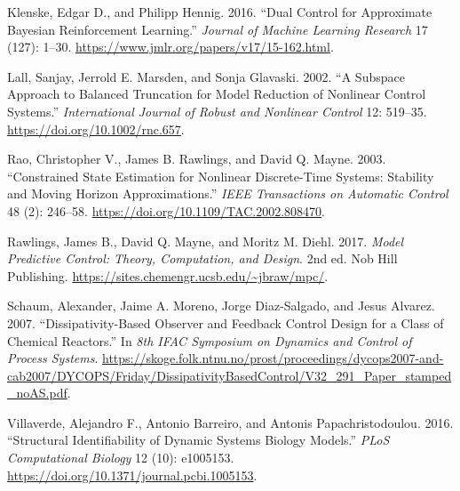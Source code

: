 \documentclass[
  11pt,
]{article}
\newlength{\cslhangindent}
\newlength{\cslentryspacingunit} %
\newenvironment{CSLReferences}[2] %
 {%
  \setlength{\parindent}{0pt}
  \ifodd #1
  \let\oldpar\par
  \def\par{\hangindent=\cslhangindent\oldpar}
  \fi
  \setlength{\parskip}{#2\cslentryspacingunit}
 }%
 {}
\begin{document}
\begin{CSLReferences}{1}{0}
\leavevmode{}%
Klenske, Edgar D., and Philipp Hennig. 2016. {``Dual Control for
Approximate Bayesian Reinforcement Learning.''} \emph{Journal of Machine
Learning Research} 17 (127): 1--30.
\url{https://www.jmlr.org/papers/v17/15-162.html}.

\leavevmode{}%
Lall, Sanjay, Jerrold E. Marsden, and Sonja Glavaski. 2002. {``A
Subspace Approach to Balanced Truncation for Model Reduction of
Nonlinear Control Systems.''} \emph{International Journal of Robust and
Nonlinear Control} 12: 519--35. \url{https://doi.org/10.1002/rnc.657}.

\leavevmode{}%
Rao, Christopher V., James B. Rawlings, and David Q. Mayne. 2003.
{``Constrained State Estimation for Nonlinear Discrete-Time Systems:
Stability and Moving Horizon Approximations.''} \emph{IEEE Transactions
on Automatic Control} 48 (2): 246--58.
\url{https://doi.org/10.1109/TAC.2002.808470}.

\leavevmode{}%
Rawlings, James B., David Q. Mayne, and Moritz M. Diehl. 2017.
\emph{Model Predictive Control: Theory, Computation, and Design}. 2nd
ed. Nob Hill Publishing.
\url{https://sites.chemengr.ucsb.edu/~jbraw/mpc/}.

\leavevmode{}%
Schaum, Alexander, Jaime A. Moreno, Jorge Diaz-Salgado, and Jesus
Alvarez. 2007. {``Dissipativity-Based Observer and Feedback Control
Design for a Class of Chemical Reactors.''} In \emph{8th IFAC Symposium
on Dynamics and Control of Process Systems}.
\url{https://skoge.folk.ntnu.no/prost/proceedings/dycops2007-and-cab2007/DYCOPS/Friday/DissipativityBasedControl/V32_291_Paper_stamped_noAS.pdf}.

\leavevmode{}%
Villaverde, Alejandro F., Antonio Barreiro, and Antonis
Papachristodoulou. 2016. {``Structural Identifiability of Dynamic
Systems Biology Models.''} \emph{PLoS Computational Biology} 12 (10):
e1005153. \url{https://doi.org/10.1371/journal.pcbi.1005153}.

\end{CSLReferences}
\end{document}
